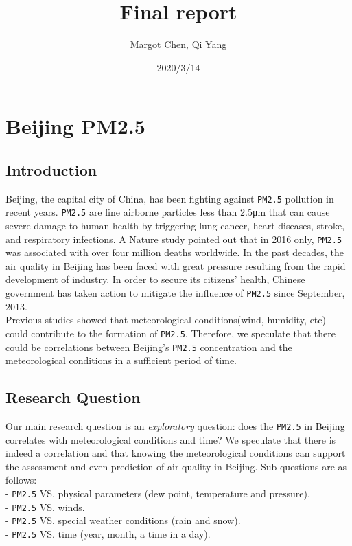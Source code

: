 \documentclass[]{article}
\title{Final report}
\author{Margot Chen, Qi Yang}
\date{2020/3/14}
\begin{document}
\maketitle

\hypertarget{beijing-pm2.5}{%
\section{Beijing PM2.5}\label{beijing-pm2.5}}

\hypertarget{introduction}{%
\subsection{Introduction}\label{introduction}}

Beijing, the capital city of China, has been fighting against
\texttt{PM2.5} pollution in recent years. \texttt{PM2.5} are fine
airborne particles less than 2.5μm that can cause severe damage to human
health by triggering lung cancer, heart diseases, stroke, and
respiratory infections. A Nature study pointed out that in 2016 only,
\texttt{PM2.5} was associated with over four million deaths worldwide.
In the past decades, the air quality in Beijing has been faced with
great pressure resulting from the rapid development of industry. In
order to secure its citizens' health, Chinese government has taken
action to mitigate the influence of \texttt{PM2.5} since September,
2013.\\
Previous studies showed that meteorological conditions(wind, humidity,
etc) could contribute to the formation of \texttt{PM2.5}. Therefore, we
speculate that there could be correlations between Beijing's
\texttt{PM2.5} concentration and the meteorological conditions in a
sufficient period of time.

\hypertarget{research-question}{%
\subsection{Research Question}\label{research-question}}

Our main research question is an \emph{exploratory} question: does the
\texttt{PM2.5} in Beijing correlates with meteorological conditions and
time? We speculate that there is indeed a correlation and that knowing
the meteorological conditions can support the assessment and even
prediction of air quality in Beijing. Sub-questions are as follows:\\
- \texttt{PM2.5} VS. physical parameters (dew point, temperature and
pressure).\\
- \texttt{PM2.5} VS. winds.\\
- \texttt{PM2.5} VS. special weather conditions (rain and snow).\\
- \texttt{PM2.5} VS. time (year, month, a time in a day).
\end{document}
